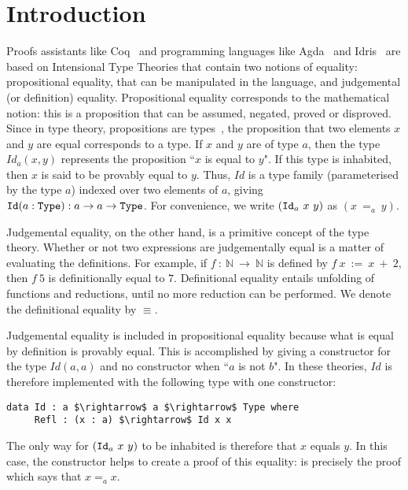 \section{Introduction}

Proofs assistants like Coq~\cite{BertotC04} 
and programming languages like 
Agda~\cite{DBLP:conf/tldi/Norell09} and
Idris~\cite{brady2013idris} are based on Intensional Type Theories that contain
two notions of equality: propositional equality, that can be
manipulated in the language, and judgemental (or definition) equality.
Propositional equality corresponds to the mathematical notion: this is
a proposition that can be assumed, negated, proved or disproved. Since in type
theory, propositions are types~\cite{How80}, the proposition that two
elements $x$ and $y$ are equal corresponds to a type.
If $x$ and $y$ are of type $a$, then the type
$Id_a(x, y)$ represents the proposition ``$x$ is equal to $y$". If this type is
inhabited, then $x$ is said to be provably equal to $y$. Thus, $Id$ is a type family (parameterised by the type $a$) indexed over two elements of $a$, giving ${\mbox{\texttt{Id}}} (a:{\mbox{\texttt{Type}}}):a \rightarrow a \rightarrow {\mbox{\texttt{Type}}}$. For
convenience, we write $(\code{Id}_a\ x\ y)$ as $(x\ =_a\ y)$. 

Judgemental equality, on the other hand, is a primitive concept of
the type theory.
Whether or not two expressions are judgementally equal is a matter of
evaluating the definitions. For example, if $f\ :\ \mathbb{N}\ \rightarrow\
\mathbb{N}$ is defined by $f\ x\ :=\ x\ +\ 2$, then $f\ 5$ is
definitionally equal to $7$. Definitional equality entails unfolding
of functions and reductions, until no more reduction can be
performed. We denote the definitional equality by $\equiv$.

Judgemental equality is included in propositional equality
because what is equal by definition is provably equal. This is
accomplished by giving a constructor for the type $Id(a,a)$ and no
constructor when ``$a$ is not $b$".  In these theories, $Id$ is therefore
implemented with the following type with one constructor:

\begin{lstlisting}
data Id : a $\rightarrow$ a $\rightarrow$ Type where
     Refl : (x : a) $\rightarrow$ Id x x
\end{lstlisting}

The only way for $(\code{Id}_a\ x\ y)$ to be inhabited is therefore that $x$
equals $y$. In this case, the constructor \code{Refl} helps
to create a proof of this equality:  is precisely the proof
which says that $x=_ax$. 

